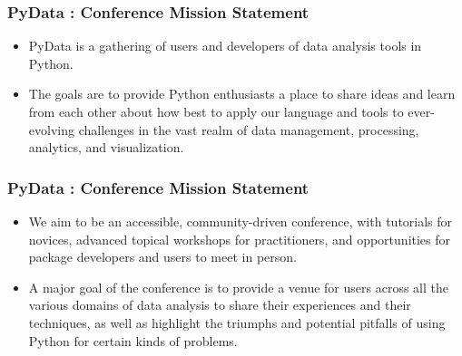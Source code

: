 \documentclass[PredictiveAnalytics101.tex]{subfiles}
\begin{document}
 
	\begin{frame}
		\frametitle{PyData :  Conference Mission Statement}
		\Large
		
		\begin{itemize}
			\item PyData is a gathering of users and developers of data analysis tools in Python. \bigskip
			\item The goals are to provide Python enthusiasts a place to share ideas and learn from each other about how best to apply our language and tools to ever-evolving challenges in the vast realm of data management, processing, analytics, and visualization.
		\end{itemize}
		
		
	\end{frame}
	\begin{frame}
		\Large
		\frametitle{PyData :  Conference Mission Statement}
		\Large
		\begin{itemize}
			\item We aim to be an accessible, community-driven conference, with tutorials for novices, advanced topical workshops for practitioners, and opportunities for package developers and users to meet in person.
			
			\item A major goal of the conference is to provide a venue for users across all the various domains of data analysis to share their experiences and their techniques, as well as highlight the triumphs and potential pitfalls of using Python for certain kinds of problems.
		\end{itemize}
	\end{frame}
\end{document}
